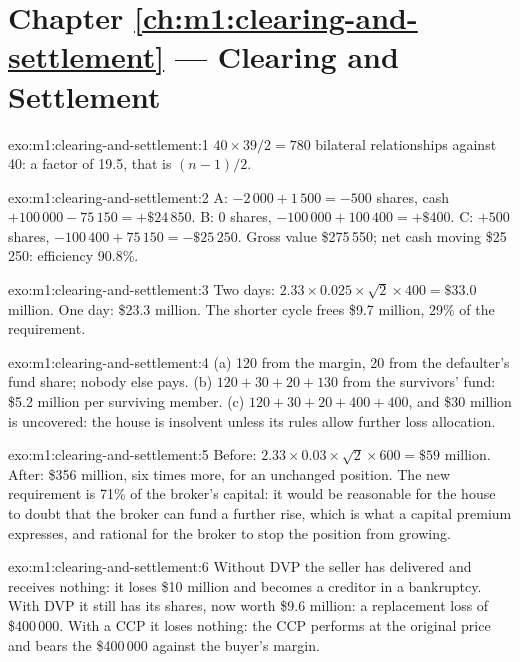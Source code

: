 \section*{Chapter \ref{ch:m1:clearing-and-settlement} --- Clearing and Settlement}

\begin{solution}{exo:m1:clearing-and-settlement:1}
$40\times39/2 = 780$ bilateral relationships against 40: a factor of 19.5,
that is $(n-1)/2$.
\end{solution}

\begin{solution}{exo:m1:clearing-and-settlement:2}
A: $-2\,000 + 1\,500 = -500$ shares, cash $+100\,000 - 75\,150 =
+\$24\,850$. B: $0$ shares, $-100\,000 + 100\,400 = +\$400$. C: $+500$
shares, $-100\,400 + 75\,150 = -\$25\,250$. Gross value \$275\,550; net cash
moving \$25\,250: efficiency 90.8\%.
\end{solution}

\begin{solution}{exo:m1:clearing-and-settlement:3}
Two days: $2.33 \times 0.025 \times \sqrt2 \times 400 = \$33.0$ million. One
day: \$23.3 million. The shorter cycle frees \$9.7 million, 29\% of the
requirement.
\end{solution}

\begin{solution}{exo:m1:clearing-and-settlement:4}
(a) 120 from the margin, 20 from the defaulter's fund share; nobody else
pays. (b) $120 + 30 + 20 + 130$ from the survivors' fund: \$5.2 million per
surviving member. (c) $120 + 30 + 20 + 400 + 400$, and \$30 million is
uncovered: the  house is insolvent unless its rules allow further
loss allocation.
\end{solution}

\begin{solution}{exo:m1:clearing-and-settlement:5}
Before: $2.33\times0.03\times\sqrt2\times600 = \$59$ million. After: \$356
million, six times more, for an unchanged position. The new requirement is
71\% of the broker's capital: it would be reasonable for the  house
to doubt that the broker can fund a further rise, which is what a capital
premium expresses, and rational for the broker to stop the position from
growing.
\end{solution}

\begin{solution}{exo:m1:clearing-and-settlement:6}
Without DVP the seller has delivered and receives nothing: it loses \$10
million and becomes a creditor in a bankruptcy. With DVP it still has its
shares, now worth \$9.6 million: a replacement loss of \$400\,000. With a
CCP it loses nothing: the CCP performs at the original price and bears the
\$400\,000 against the buyer's margin.
\end{solution}


